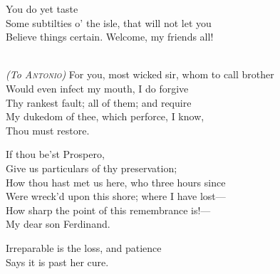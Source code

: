 \begin{verse_speech}[Prospero] 
You do yet taste\\
Some subtilties o' the isle, that will not let you\\
Believe things certain. Welcome, my friends all!\\
\end{verse_speech}


\begin{verse_speech}[Prospero] 
\\
\textit{(To \textsc{Antonio})} For you, most wicked sir, whom to call brother\\
Would even infect my mouth, I do forgive\\
Thy rankest fault; all of them; and require\\
My dukedom of thee, which perforce, I know,\\
Thou must restore.
\end{verse_speech}

\begin{verse_speech}[Alonso] 
If thou be'st Prospero,\\
Give us particulars of thy preservation;\\
How thou hast met us here, who three hours since\\
Were wreck'd upon this shore; where I have lost—\\
How sharp the point of this remembrance is!—\\
My dear son Ferdinand.
\end{verse_speech}


\begin{verse_speech}[Alonso] 
Irreparable is the loss, and patience\\
Says it is past her cure.
\end{verse_speech}

